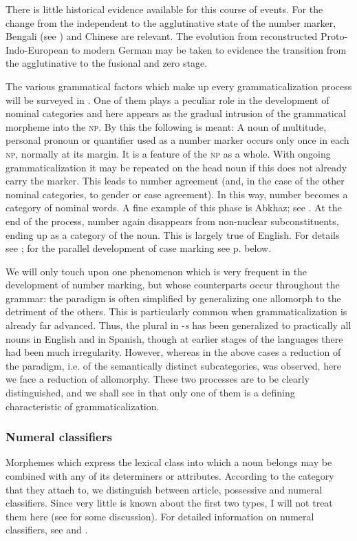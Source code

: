 There is little historical evidence available for this course of events. For the change from the independent to the agglutinative state of the number marker, Bengali (see \citealt{Kölver1982a}) and Chinese are relevant. The evolution from reconstructed Proto-Indo-European to modern German may be taken to evidence the transition from the agglutinative to the fusional and zero stage.

\label{page63}The various grammatical factors which make up every grammaticalization process will be surveyed in . One of them plays a peculiar role in the development of nominal categories and here appears as the gradual intrusion of the grammatical morpheme into the \textsc{np}. By this the following is meant: A noun of multitude, personal pronoun or quantifier used as a number marker occurs only once in each \textsc{np}, normally at its margin. It is a feature of the \textsc{np} as a whole. With ongoing grammaticalization it may be repeated on the head noun if this does not already carry the marker. This leads to number agreement (and, in the case of the other nominal categories, to gender or case agreement). In this way, number becomes a category of nominal words. A fine example of this phase is Abkhaz; see \citet[222f]{Hewitt1979}. At the end of the process, number again disappears from non-nuclear subconstituents, ending up as a category of the noun. This is largely true of English. For details see \citealt[§~6.3]{Lehmann1982b}; for the parallel development of case marking see p. \pageref{page92}\chk%
  below.

We will only touch upon one phenomenon which is very frequent in the development of number marking, but whose counterparts occur throughout the grammar: the paradigm is often simplified by generalizing one allomorph to the detriment of the others. This is particularly common when grammaticalization is already far advanced. Thus, the plural in -\textit{s} has been generalized to practically all nouns in English and in Spanish, though at earlier stages of the languages there had been much irregularity. However, whereas in the above cases a reduction of the paradigm, i.e. of the semantically distinct subcategories, was observed, here we face a reduction of allomorphy. These two processes are to be clearly distinguished, and we shall see in  that only one of them is a defining characteristic of grammaticalization.

\subsubsection{Numeral classifiers}
Morphemes which express the lexical class into which a noun belongs may be combined with any of its determiners or attributes. According to the category that they attach to, we distinguish between article, possessive and numeral classifiers. Since very little is known about the first two types, I will not treat them here (see \citealt[§~6.3.3]{Lehmann1982b} for some discussion). For detailed information on numeral classifiers, see \citealt{Kölver1982b} and \citealt{Serzisko1980,Serzisko1982}.

